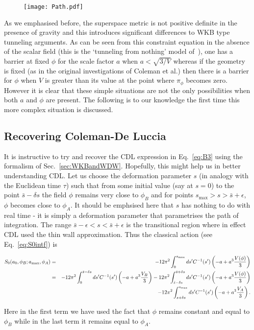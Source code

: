 \documentclass[a4paper,11pt]{article}
\numberwithin{equation}{section}
\begin{document}
\begin{figure}[h!] 
\begin{center} 
\texttt{[image: Path.pdf]}
\caption{\label{fig:Path}}
\end{center} 
\end{figure}

As we emphasised before, the superspace metric is not positive definite in the presence of gravity and this introduces significant differences to  WKB type tunneling arguments. As can be seen from this constraint equation in the absence of the scalar field (this is the `tunneling from nothing' model of~\cite{Vilenkin:1982de, Hartle:1983ai, Vilenkin:1984wp,Linde:1983mx}), one has a barrier at fixed $\phi$ for the scale factor $a$ when $a<\sqrt{3/V}$  whereas if the geometry is fixed (as in the original investigations of Coleman et al.) then there is a barrier for $\phi$ when $V$ is greater than its value at the point where $\pi_{\phi}$ becomes zero. However it is clear that these simple situations are not the only possibilities when both $a$ and $\phi$ are present. The following is to our knowledge the first time this more complex situation is discussed.

\subsection{Recovering Coleman-De Luccia}
\label{sec:RecoveringCDL}

It is instructive to try and recover the CDL expression in Eq.~\eqref{eq:B3} using the formalism of Sec.~\ref{sec:WKBandWDW}. Hopefully, this might help us in better understanding CDL. Let us choose the deformation parameter $s$ (in analogy with the Euclidean
time $\tau$) such that from some initial value (say at $s=0$) to
the point $\bar{s}-\delta s$ the field $\phi$ remains very close
to $\phi_{B}$ and for points $s_{\max}>s>\bar{s}+\epsilon$, $\phi$
becomes close to $\phi_{A}$. It should be emphsised here that $s$
has nothing to do with real time - it is simply a deformation parameter
that parametrises the path of integration. The range $\bar{s}-\epsilon<s<\bar{s}+\epsilon$
is the transitional region where in effect CDL used the thin wall
approximation. Thus the classical action (see Eq.~\eqref{eq:S0intf})
is 
\begin{small}
\begin{eqnarray}
S_{0}(a_{0},\phi_{B};a_{{\rm max}},\phi_{A}) & = & -12\pi^{2}\int_{0}^{s_{{\rm max}}}ds'C^{-1}(s')\left(-a+a^{3}\frac{V(\phi)}{3}\right)\nonumber \\
 & = & -12\pi^{2}\int_{0}^{\bar{s}-\delta s}ds'C^{-1}(s')\left(-a+a^{3}\frac{V_{B}}{3}\right)-12\pi^{2}\int_{\bar{s}-\delta s}^{\bar{s}+\delta s}ds'C^{-1}(s')\left(-a+a^{3}\frac{V(\phi)}{3}\right)\nonumber \\
 &  & -12\pi^{2}\int_{s+\delta s}^{s_{{\rm max}}}ds'C^{-1}(s')\left(-a+a^{3}\frac{V_{A}}{3}\right).\label{eq:SAB1}
\end{eqnarray}
\end{small}
Here in the first term we have used the fact that $\phi$ remains constant
and equal to $\phi_{B}$ while in the last term it remains equal to
$\phi_{A}.$ 
\end{document}
